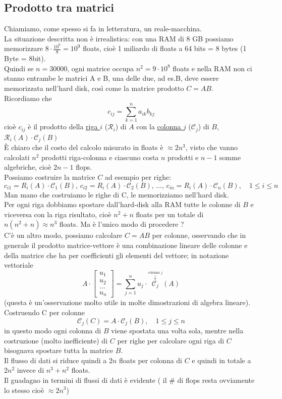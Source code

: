 \subsection{Prodotto tra matrici}
Chiamiamo, come spesso si fa in letteratura,  un reale-macchina.\\
La situazione descritta non è irrealistica: con una RAM di 8 GB possiamo memorizzare $8\cdot \frac{10^9}{8}=10^9$ floats, cioè 1 miliardo di floats a 64 bits = 8 bytes (1 Byte = 8bit).\\
Quindi se $n=30000$, ogni matrice occupa $n^2=9\cdot 10^8$ floats e nella RAM non ci stanno entrambe le matrici A e B, una delle due, ad es.B, deve essere memorizzata nell'hard disk, così come la matrice prodotto $C=AB$.\\
Ricordiamo che 
\[ c_{ij}=\sum_{k=1}^n a_{ik}b_{kj} \]
cioè $c_{ij}$ è il prodotto della \uline{riga $i$} ($\mathcal{R}_{i}$) di $A$ con la \uline{colonna $j$} ($\mathcal{C}_{j}$) di $B$, $\mathcal{R}_{i}(A)\cdot \mathcal{C}_{j}(B)$\\
È chiaro che il costo del calcolo misurato in floats è $\approx 2n^3$, visto che vanno calcolati $n^2$ prodotti riga-colonna e ciascuno costa $n$ prodotti e $n-1$ somme algebriche, cioè $2n-1$ flops. \\
Possiamo costruire la matrice $C$ ad esempio per righe: \\
\[c_{i1} = R_i(A)\cdot\mathcal{C}_1(B),\,c_{i2} = R_i(A)\cdot\mathcal{C}_2(B),\, \dotsc ,\, c_{in} = R_i(A)\cdot\mathcal{C}_n(B),\quad 1 \le i \le n\]
Man mano che costruiamo le righe di C, le memorizziamo nell'hard disk. \\
Per ogni riga dobbiamo spostare dall'hard-disk alla RAM tutte le colonne di $B$ e viceversa con la riga risultato, cioè $n^2+n$ floats per un totale di $n(n^2+n) \approx n^3$ floats. Ma è l'unico modo di procedere ? \\
C'è un altro modo, possiamo calcolare $C=AB$ per colonne, osservando che in generale il prodotto matrice-vettore è una combinazione lineare delle colonne e della matrice che ha per coefficienti gli elementi del vettore; in notazione vettoriale \\
\[A \cdot \begin{bmatrix} u_1 \\ u_2 \\ ... \\ u_n \end{bmatrix} = \sum_{j=1}^{n} u_j \cdot \overset{\overset{\text{colonna $j$}}{\downarrow}}{\mathcal{C}_j}(A) \]
(questa è un'osservazione molto utile in molte dimostrazioni di algebra lineare).\\
Costruendo C per colonne 
\[\mathcal{C}_j(C) = A\cdot \mathcal{C}_j(B),\quad 1 \le j \le n\]
in questo modo ogni colonna di $B$ viene spostata una volta sola, mentre nella costruzione (molto inefficiente) di $C$ per righe per calcolare ogni riga di $C$ bisognava spostare tutta la matrice $B$.\\
Il flusso di dati si riduce quindi a $2n$ floats per colonna di $C$ e quindi in totale a $2n^2$ invece di $n^3+n^2$ floats.\\
Il guadagno in termini di flussi di dati è evidente ( il \# di flops resta ovviamente lo stesso cioè $\approx 2n^3$)

